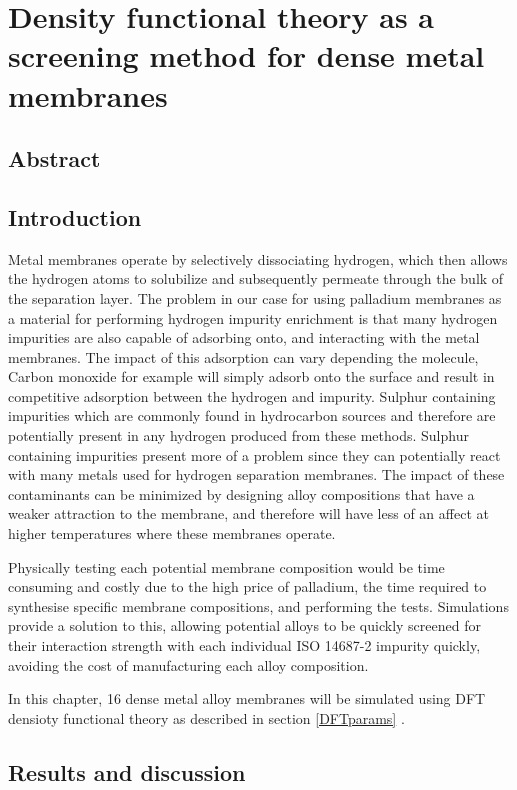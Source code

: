 \chapter{Density functional theory as a screening method for dense metal membranes}

\section{Abstract}

\section{Introduction}
Metal membranes operate by selectively dissociating hydrogen, which then allows the hydrogen atoms to solubilize and subsequently permeate through the bulk of the separation layer. The problem in our case for using palladium membranes as a material for performing hydrogen impurity enrichment is that many hydrogen impurities are also capable of adsorbing onto, and interacting with the metal membranes. The impact of this adsorption can vary depending the molecule, Carbon monoxide for example will simply adsorb onto the surface and result in competitive adsorption between the hydrogen and impurity. Sulphur containing impurities which are commonly found in hydrocarbon sources and therefore are potentially present in any hydrogen produced from these methods. Sulphur containing impurities present more of a problem since they can potentially react with many metals used for hydrogen separation membranes. The impact of these contaminants can be minimized by designing alloy compositions that have a weaker attraction to the membrane, and therefore will have less of an affect at higher temperatures where these membranes operate.

Physically testing each potential membrane composition would be time consuming and costly due to the high price of palladium, the time required to synthesise specific membrane compositions, and performing the tests. Simulations provide a solution to this, allowing potential alloys to be quickly screened for their interaction strength with each individual ISO 14687-2 impurity quickly, avoiding the cost of manufacturing each alloy composition. 

In this chapter, 16 dense metal alloy membranes will be simulated using DFT densioty functional theory as described in section \ref{DFTparams} \cite{QE-2009, QE-2017, doi:10.1063/5.0005082}. 

\section{Results and discussion}



